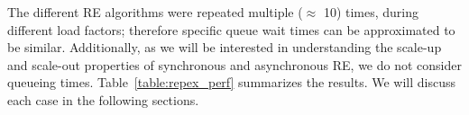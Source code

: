 \documentclass{rspublic}
\newcommand{\jhanote}[1]{ {\textcolor{red} { ***shantenu: #1 }}}
\newcommand{\athotanote}[1]{ {\textcolor{green} { ***athota: #1 }}}
\newcommand{\athotanote}[1]{}
\newcommand{\jhanote}[1]{}
\begin{document}

The different RE algorithms were repeated multiple ($\approx$ 10)
times, during different load factors; therefore specific queue wait
times can be approximated to be similar.  Additionally, as we will
be interested in understanding the scale-up and scale-out properties
of synchronous and asynchronous RE, we do not consider queueing 
times.  Table~\ref{table:repex_perf} summarizes the results. We will
discuss each case in the following sections.
\end{document}
